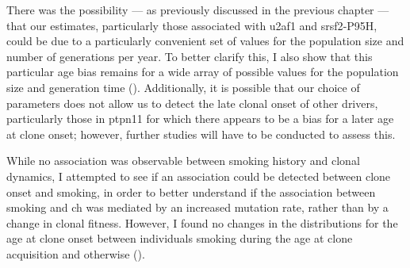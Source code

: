 \begin{figure}[!ht]
	\label{fig:age-at-onset-vs-growth}
\end{figure}

There was the possibility --- as previously discussed in the previous chapter --- that our estimates, particularly those associated with \ac{u2af1} and \ac{srsf2}-P95H, could be due to a particularly convenient set of values for the population size and number of generations per year. To better clarify this, I also show that this particular age bias remains for a wide array of possible values for the population size and generation time (). Additionally, it is possible that our choice of parameters does not allow us to detect the late clonal onset of other drivers, particularly those in \ac{ptpn11} for which there appears to be a bias for a later age at clone onset; however, further studies will have to be conducted to assess this.

\begin{figure}[!ht]
	\label{fig:ages-at-onset-benchmark}
\end{figure}

While no association was observable between smoking history and clonal dynamics, I attempted to see if an association could be detected between clone onset and smoking, in order to better understand if the association between smoking and \ac{ch} was mediated by an increased mutation rate, rather than by a change in clonal fitness. However, I found no changes in the distributions for the age at clone onset between individuals smoking during the age at clone acquisition and otherwise ().

\begin{figure}[!ht]
	\label{fig:smoking-age-density}
\end{figure}

